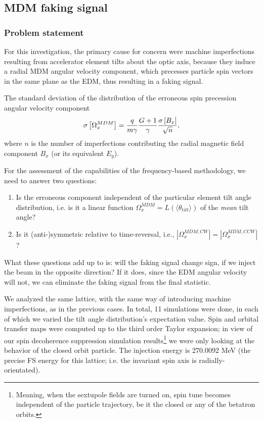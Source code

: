 \documentclass[]{elsarticle}
\newcommand{\W}{\Omega}
\newcommand{\SD}[1]{\sigma\bkt*{#1}}
\newcommand{\avg}[1]{\langle{#1}\rangle}
\begin{document}
\subsection{MDM faking signal}
\subsubsection{Problem statement}
For this investigation, the primary cause for concern were machine imperfections resulting from
accelerator element tilts about the optic axis, because they induce a radial MDM angular velocity component,
which precesses particle spin vectors in the same plane as the EDM, thus resulting in a faking signal.

The standard deviation of the distribution of the erroneous spin precession angular velocity component
\begin{equation}\label{eq:MDM_freq_SD}
  \SD{\W_x^{MDM}} = \frac{q}{m\gamma} \frac{G+1}{\gamma}\frac{\SD{B_x}}{\sqrt{n}},
\end{equation}
where $n$ is the number of imperfections contributing the radial magnetic field component $B_x$
(or its equivalent $E_y$).



For the assessment of the capabilities of the frequency-based methodology, we need to answer two questions:
\begin{enumerate}[(1)]
\item Is the erroneous component independent of the particular element tilt angle distribution, i.e. is it
  a linear function $\W_x^{MDM} = L(\avg{\theta_{tilt}})$ of the \emph{mean} tilt angle?
  \item Is it (anti-)symmetric relative to time-reversal, i.e., $|\W_x^{MDM,CW}| = |\W_x^{MDM,CCW}|$?
\end{enumerate}
What these questions add up to is: will the faking signal change sign, if we inject the beam in the opposite
direction? If it does, since the EDM angular velocity will not, we can eliminate the faking signal
from the final statistic.

We analyzed the same lattice, with the same way of introducing machine imperfections, as in the previous cases.
In total, 11 simulations were done, in each of which we varied the tilt angle distribution's expectation value.
Spin and orbital transfer maps were computed up to the third order Taylor expansion; in view of
our spin decoherence suppression simulation results\footnote{Meaning, when the sextupole fields are turned on,
  spin tune becomes independent of the particle trajectory, be it the closed or any of the betatron orbits.}
we were only looking at the behavior of the closed orbit particle.
The injection energy is 270.0092 MeV (the precise FS energy for this lattice; i.e.
the invariant spin axis is radially-orientated).
\end{document}
